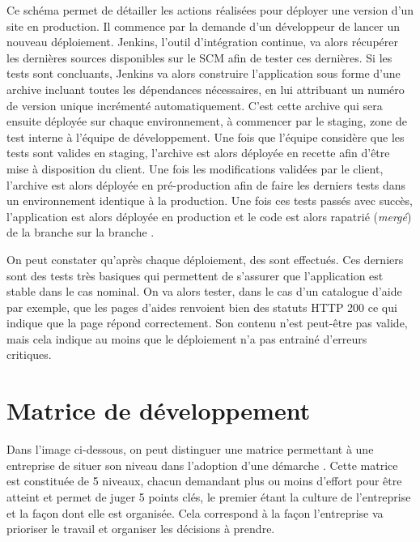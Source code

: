 Ce schéma permet de détailler les actions réalisées pour déployer une version d'un site \naq{} en production. Il commence par la demande d'un développeur de lancer un nouveau déploiement. Jenkins, l'outil d'intégration continue, va alors récupérer les dernières sources disponibles sur le \gls{SCM} afin de tester ces dernières. Si les tests sont concluants, Jenkins va alors construire l'application sous forme d'une archive incluant toutes les dépendances nécessaires, en lui attribuant un numéro de version unique incrémenté automatiquement. C'est cette archive qui sera ensuite déployée sur chaque environnement, à commencer par le staging, zone de test interne à l'équipe de développement. Une fois que l'équipe considère que les tests sont valides en staging, l'archive est alors déployée en recette afin d'être mise à disposition du client. Une fois les modifications validées par le client, l'archive est alors déployée en pré-production afin de faire les derniers tests dans un environnement identique à la production. Une fois ces tests passés avec succès, l'application est alors déployée en production et le code est alors rapatrié (\emph{mergé}) de la branche  sur la branche . 

On peut constater qu'après chaque déploiement, des  sont effectués. Ces derniers sont des tests très basiques qui permettent de s'assurer que l'application est stable dans le cas nominal. On va alors tester, dans le cas d'un catalogue d'aide par exemple, que les pages d'aides renvoient bien des statuts \gls{HTTP} 200 ce qui indique que la page répond correctement. Son contenu n'est peut-être pas valide, mais cela indique au moins que le déploiement n'a pas entrainé d'erreurs critiques. 


\clearpage
\section{Matrice de développement \devops}

Dans l'image ci-dessous, on peut distinguer une matrice permettant à une entreprise de situer son niveau dans l'adoption d'une démarche \devops. Cette matrice est constituée de 5 niveaux, chacun demandant plus ou moins d'effort pour être atteint et permet de juger 5 points clés, le premier étant la culture de l'entreprise et la façon dont elle est organisée. Cela correspond à la façon l'entreprise va prioriser le travail et organiser les décisions à prendre.

